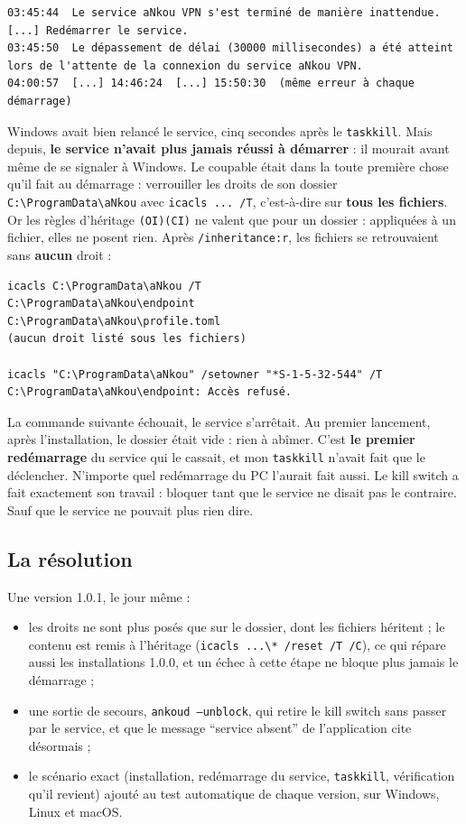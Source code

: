 \documentclass[10pt,twoside,openany]{article}
\begin{document}
\begin{lstlisting}
03:45:44  Le service aNkou VPN s'est terminé de manière inattendue. [...] Redémarrer le service.
03:45:50  Le dépassement de délai (30000 millisecondes) a été atteint lors de l'attente de la connexion du service aNkou VPN.
04:00:57  [...] 14:46:24  [...] 15:50:30  (même erreur à chaque démarrage)
\end{lstlisting}

Windows avait bien relancé le service, cinq secondes après le \texttt{taskkill}. Mais depuis, \textbf{le service n'avait plus jamais réussi à démarrer} : il mourait avant même de se signaler à Windows. Le coupable était dans la toute première chose qu'il fait au démarrage : verrouiller les droits de son dossier \texttt{C:\textbackslash{}ProgramData\textbackslash{}aNkou} avec \texttt{icacls ... /T}, c'est-à-dire sur \textbf{tous les fichiers}. Or les règles d'héritage \texttt{(OI)(CI)} ne valent que pour un dossier : appliquées à un fichier, elles ne posent rien. Après \texttt{/inheritance:r}, les fichiers se retrouvaient sans \textbf{aucun} droit :

\begin{lstlisting}
icacls C:\ProgramData\aNkou /T
C:\ProgramData\aNkou\endpoint
C:\ProgramData\aNkou\profile.toml
(aucun droit listé sous les fichiers)

icacls "C:\ProgramData\aNkou" /setowner "*S-1-5-32-544" /T
C:\ProgramData\aNkou\endpoint: Accès refusé.
\end{lstlisting}

La commande suivante échouait, le service s'arrêtait. Au premier lancement, après l'installation, le dossier était vide : rien à abîmer. C'est \textbf{le premier redémarrage} du service qui le cassait, et mon \texttt{taskkill} n'avait fait que le déclencher. N'importe quel redémarrage du PC l'aurait fait aussi. Le kill switch a fait exactement son travail : bloquer tant que le service ne disait pas le contraire. Sauf que le service ne pouvait plus rien dire.

\subsection*{La résolution}
Une version 1.0.1, le jour même :
\begin{itemize}
  \item les droits ne sont plus posés que sur le dossier, dont les fichiers héritent ; le contenu est remis à l'héritage (\texttt{icacls ...\textbackslash{}* /reset /T /C}), ce qui répare aussi les installations 1.0.0, et un échec à cette étape ne bloque plus jamais le démarrage ;
  \item une sortie de secours, \texttt{ankoud --unblock}, qui retire le kill switch sans passer par le service, et que le message \enquote{service absent} de l'application cite désormais ;
  \item le scénario exact (installation, redémarrage du service, \texttt{taskkill}, vérification qu'il revient) ajouté au test automatique de chaque version, sur Windows, Linux et macOS.
\end{itemize}
\end{document}
